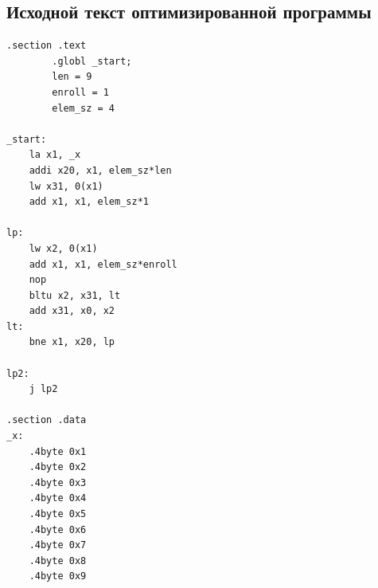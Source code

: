\documentclass{article}
\begin{document}
\clearpage\subsection{Исходной текст оптимизированной программы}
\begin{lstlisting}[style=lst, caption=Исходный текст оптимизированной программы]
        .section .text
        .globl _start;
        len = 9
        enroll = 1
        elem_sz = 4

_start:
    la x1, _x
    addi x20, x1, elem_sz*len
    lw x31, 0(x1)
    add x1, x1, elem_sz*1

lp:
    lw x2, 0(x1)
    add x1, x1, elem_sz*enroll
    nop
    bltu x2, x31, lt
    add x31, x0, x2
lt:
    bne x1, x20, lp

lp2:
    j lp2

.section .data
_x:
    .4byte 0x1
    .4byte 0x2
    .4byte 0x3
    .4byte 0x4
    .4byte 0x5
    .4byte 0x6
    .4byte 0x7
    .4byte 0x8
    .4byte 0x9
\end{lstlisting}
\end{document}
